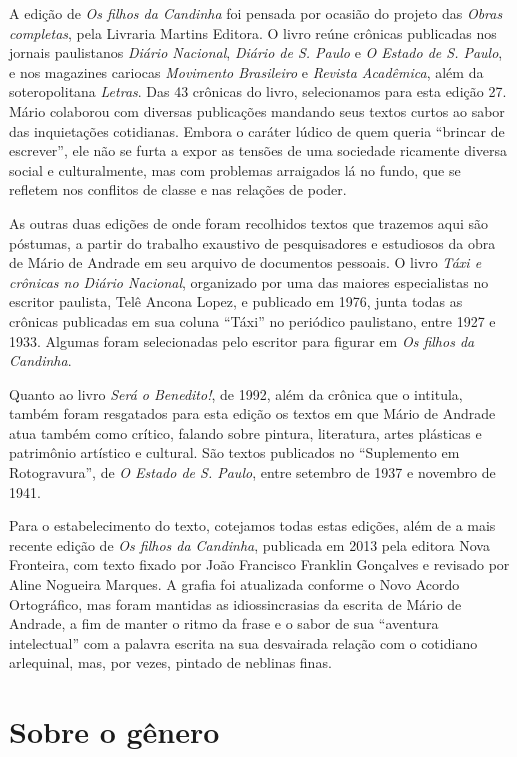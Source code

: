 A edição de \emph{Os filhos da Candinha} foi pensada por ocasião do
projeto das \emph{Obras completas}, pela Livraria Martins Editora. O
livro reúne crônicas publicadas nos jornais paulistanos \emph{Diário
Nacional}, \emph{Diário de S. Paulo} e \emph{O Estado de S. Paulo}, e
nos magazines cariocas \emph{Movimento Brasileiro} e \emph{Revista
Acadêmica}, além da soteropolitana \emph{Letras}. Das 43 crônicas do
livro, selecionamos para esta edição 27. Mário colaborou com diversas
publicações mandando seus textos curtos ao sabor das inquietações
cotidianas. Embora o caráter lúdico de quem queria ``brincar de
escrever'', ele não se furta a expor as tensões de uma sociedade
ricamente diversa social e culturalmente, mas com problemas arraigados
lá no fundo, que se refletem nos conflitos de classe e nas relações de
poder.

As outras duas edições de onde foram recolhidos textos que trazemos aqui
são póstumas, a partir do trabalho exaustivo de pesquisadores e
estudiosos da obra de Mário de Andrade em seu arquivo de documentos
pessoais. O livro \emph{Táxi e crônicas no Diário Nacional}, organizado
por uma das maiores especialistas no escritor paulista, Telê Ancona
Lopez, e publicado em 1976, junta todas as crônicas publicadas em sua
coluna ``Táxi'' no periódico paulistano, entre 1927 e 1933. Algumas
foram selecionadas pelo escritor para figurar em \emph{Os filhos da
Candinha}.

Quanto ao livro \emph{Será o Benedito!}, de 1992, além da crônica que o
intitula, também foram resgatados para esta edição os textos em que
Mário de Andrade atua também como crítico, falando sobre pintura,
literatura, artes plásticas e patrimônio artístico e cultural. São
textos publicados no ``Suplemento em Rotogravura'', de \emph{O Estado de
S. Paulo}, entre setembro de 1937 e novembro de 1941.

Para o estabelecimento do texto, cotejamos todas estas edições, além de
a mais recente edição de \emph{Os filhos da Candinha}, publicada em 2013
pela editora Nova Fronteira, com texto fixado por João Francisco
Franklin Gonçalves e revisado por Aline Nogueira Marques. A grafia foi
atualizada conforme o Novo Acordo Ortográfico, mas foram mantidas as
idiossincrasias da escrita de Mário de Andrade, a fim de manter o ritmo
da frase e o sabor de sua ``aventura intelectual'' com a palavra escrita
na sua desvairada relação com o cotidiano arlequinal, mas, por vezes,
pintado de neblinas finas.

\section{Sobre o gênero}
